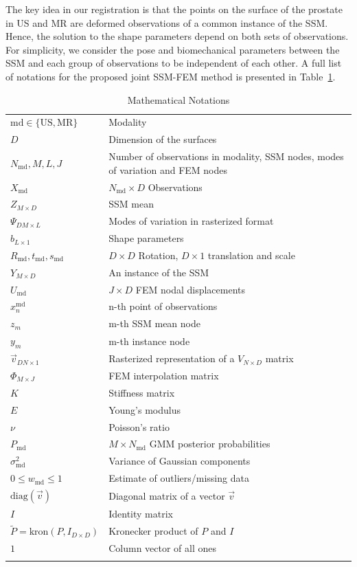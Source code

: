 \documentclass[journal]{IEEEtran}
\newcommand{\diag}{\mathrm{diag}}
\newcommand{\kron}{\mathrm{kron}}
\begin{document}
The key idea in our registration is that the points on the surface of the prostate in US and MR are deformed observations of a common instance of the SSM. Hence, the solution to the shape parameters depend on both sets of observations. For simplicity, we consider the pose and biomechanical parameters between the SSM and each group of observations to be independent of each other. A full list of notations for the proposed joint SSM-FEM method is presented in Table~\ref{tbl:notation}.
\begin{table}[!bht]
  \centering
  \caption{Mathematical Notations \label{tbl:notation}}
  \begin{tabular}{lp{}}
  \hline
    $\mathrm{md}\in\{\mathrm{US},\mathrm{MR}\}$ & Modality\\
    $D$ & Dimension of the surfaces\\
    $N_\mathrm{md},M,L,J$ & Number of observations in modality, SSM nodes, modes of variation and FEM nodes\\
    $X_\mathrm{md}$ & ${N_\mathrm{md}\times D}$ Observations\\
    $Z_{M\times D}$ & SSM mean\\
    $\Psi_{DM\times L}$ & Modes of variation in rasterized format\\
    $b_{L\times 1}$ & Shape parameters\\
    $R_\mathrm{md},t_\mathrm{md},s_\mathrm{md}$ & $D\times D$ Rotation, $D\times 1$ translation and scale\\
    $Y_{M\times D}$ & An instance of the SSM\\
    $U_\mathrm{md}$ & ${J\times D}$ FEM nodal displacements\\
    $x^\mathrm{md}_n$ & n-th point of observations\\
    $z_m$ & m-th SSM mean node\\
    $y_m$ & m-th instance node\\
    $\vec{v}_{DN \times 1}$ & Rasterized representation of a $V_{N\times D}$ matrix\\
    $\Phi_{M\times J}$ & FEM interpolation matrix\\
    $K$ & Stiffness matrix\\
    $E$ & Young's modulus\\
    $\nu$ & Poisson's ratio\\
    $P_{\mathrm{md}}$ & $M\times N_\mathrm{md}$ GMM posterior probabilities\\ 
    $\sigma_{\mathrm{md}}^2$ & Variance of Gaussian components\\
    $0{\leq}w_{\mathrm{md}}{\leq}1$ & Estimate of outliers/missing data\\
    $\diag{(\vec{v})}$ & Diagonal matrix of a vector $\vec{v}$\\
    $I$ & Identity matrix\\
    $\tilde{P} = \kron{(P,I_{D\times{D}})}$ &Kronecker product of $P$ and $I$\\
    $1$ & Column vector of all ones\\
    \hline\\
  \end{tabular}
\end{table}
\end{document}

